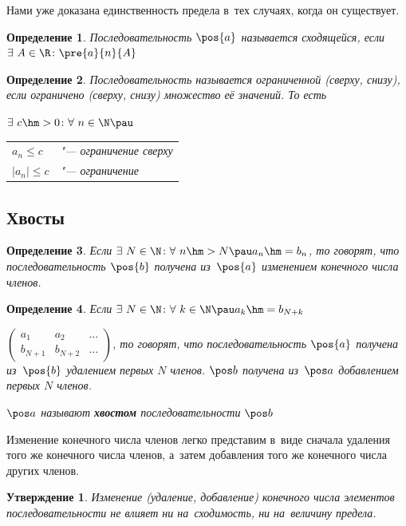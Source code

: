 \documentclass[a4paper,10pt,twoside]{article}
\newtheorem{Def}{Определение}[section]
\newtheorem{Ut}{Утверждение}[section]
\begin{document}
    Нами уже доказана единственность предела в~тех случаях, когда он существует.

    \begin{Def}
        Последовательность $\pos{a}$ называется сходящейся, если $\exists\  A\in \R\colon \pre{a}{n}{A}$
    \end{Def}

    \begin{Def}
        Последовательность называется ограниченной (сверху, снизу), если ограничено (сверху, снизу) множество её значений. То есть

        $\exists\  c\hm>0\colon \forall\  n\in\N\pau$ \begin{tabular}{ll}
        $a_n\leq c$&"--- ограничение сверху\\
        $|a_n|\leq c$&"--- ограничение
        \end{tabular}
    \end{Def}
\subsection{Хвосты}
    \begin{Def}
        Если $\exists\  N\in\N\colon \forall\  n\hm>N\pau a_n\hm=b_n$, то говорят, что последовательность $\pos{b}$ получена из~$\pos{a}$ изменением конечного числа членов.
    \end{Def}

    \begin{Def}
        Если $\exists\  N\in\N\colon \forall\  k\in\N\pau a_k\hm=b_{N+k}$

        $\begin{pmatrix}
            a_1&a_2&\ldots\\
            b_{N+1}&b_{N+2}&\ldots
        \end{pmatrix}$, то говорят, что последовательность $\pos{a}$ получена из~$\pos{b}$ удалением первых $N$ членов. $\pos b$ получена из~$\pos a$ добавлением первых $N$ членов.

        $\pos a$ называют \textbf{хвостом} последовательности $\pos b$
    \end{Def}

    Изменение конечного числа членов легко представим в~виде сначала удаления того же конечного числа членов, а~затем добавления того же конечного числа других членов.

    \begin{Ut}
        Изменение (удаление, добавление) конечного числа элементов последовательности не влияет ни на~сходимость, ни на~величину предела.
    \end{Ut}
\end{document}
